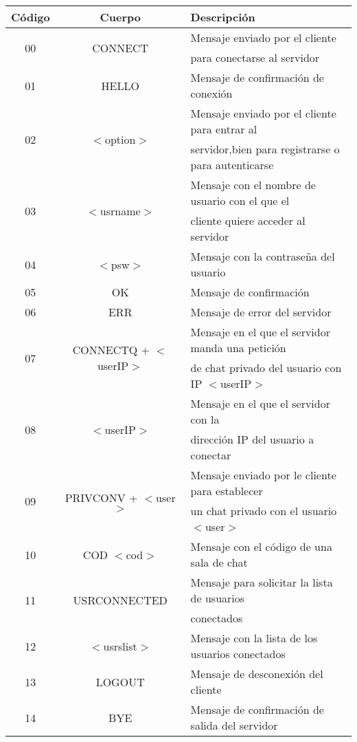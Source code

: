 \documentclass[12pt]{article}       %
\begin{document}
\begin{center}
\begin{tabular}{|c|c|l|}

\hline
Código & Cuerpo & Descripción \\
\hline
\hline
\multirow{2}{*}{00} & \multirow{2}{*}{CONNECT} &  Mensaje enviado por el cliente\\
					&						   &  para conectarse al servidor\\
\hline
01 & HELLO &  Mensaje de confirmación de conexión\\
\hline
\multirow{2}{*}{02} & \multirow{2}{*}{$<$option$>$} &  Mensaje enviado por el cliente para entrar al\\
					&							&servidor,bien para registrarse o para autenticarse\\
\hline
\multirow{2}{*}{03} & \multirow{2}{*}{$<$usrname$>$} &  Mensaje con el nombre de usuario con el que el\\
					&								 &cliente quiere acceder al servidor\\
\hline
04 & $<$psw$>$ &  Mensaje con la contraseña del usuario\\
\hline
05 & OK &  Mensaje de confirmación\\
\hline
06 & ERR &  Mensaje de error del servidor\\
\hline
\multirow{2}{*}{07} & \multirow{2}{*}{CONNECTQ + $<$userIP$>$} &  Mensaje en el que el servidor manda una petición\\
				   &										  & de chat privado del usuario con IP $<$userIP$>$ \\
\hline
\multirow{2}{*}{08} & \multirow{2}{*}{$<$userIP$>$} &  Mensaje en el que el servidor con la\\
					&								&  dirección IP del usuario a conectar\\
\hline
\multirow{2}{*}{09} & \multirow{2}{*}{PRIVCONV + $<$user$>$} & Mensaje enviado por le cliente para establecer\\
					&										 & un chat privado con el usuario $<$user$>$\\
\hline
10 & COD $<$cod$>$ & Mensaje con el código de una sala de chat\\
\hline
\multirow{2}{*}{11} & \multirow{2}{*}{USRCONNECTED} & Mensaje para solicitar la lista de usuarios\\
					& 								& conectados\\
\hline
12 & $<$usrslist$>$ & Mensaje con la lista de los usuarios conectados\\
\hline
13 & LOGOUT & Mensaje de desconexión del cliente\\
\hline
14 & BYE & Mensaje de confirmación de salida del servidor \\
\hline
\end{tabular}
\end{center}
\end{document}

